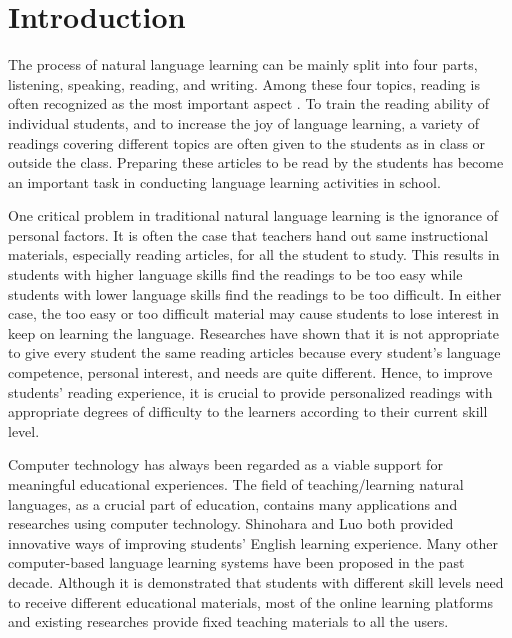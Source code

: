 \chapter{Introduction}

The process of natural language learning can be mainly split into four parts, listening, speaking, reading, and writing. Among these four topics, reading is often recognized as the most important aspect \cite{chi2007designing}. To train the reading ability of individual students, and to increase the joy of language learning, a variety of readings covering different topics are often given to the students as in class or outside the class. Preparing these articles to be read by the students has become an important task in conducting language learning activities in school. 

One critical problem in traditional natural language learning is the ignorance of personal factors. \cite{Klausmeier1977, Wu2004} It is often the case that teachers hand out same instructional materials, especially reading articles, for all the student to study. \cite{Liu2009} This results in students with higher language skills find the readings to be too easy while students with lower language skills find the readings to be too difficult. In either case, the too easy or too difficult material may cause students to lose interest in keep on learning the language. Researches have shown that it is not appropriate to give every student the same reading articles because every student's language competence, personal interest, and needs are quite different. \cite{Hsu2008, Heilman2007} Hence, to improve students' reading experience, it is crucial to provide personalized readings with appropriate degrees of difficulty to the learners according to their current skill level.

Computer technology has always been regarded as a viable support for meaningful educational experiences. The field of teaching/learning natural languages, as a crucial part of education, contains many applications and researches using computer technology. Shinohara and Luo both provided innovative ways of improving students' English learning experience. \cite{Shinohara2016, Luo2016} Many other computer-based language learning systems have been proposed in the past decade. Although it is demonstrated that students with different skill levels need to receive different educational materials, most of the online learning platforms and existing researches provide fixed teaching materials to all the users.

